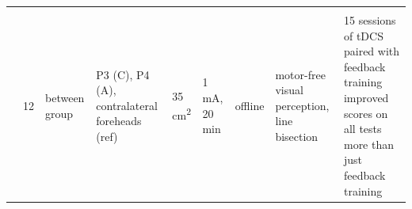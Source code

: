 \documentclass[11pt,]{memoir}
\begin{document}
\begin{longtable}[]{@{}lllllllll@{}}
\begin{minipage}[t]{0.04\columnwidth}
\strut
\end{minipage} & \begin{minipage}[t]{0.10\columnwidth}\raggedright
\strut
\end{minipage} & \begin{minipage}[t]{0.04\columnwidth}\raggedright
\strut
\end{minipage} & \begin{minipage}[t]{0.04\columnwidth}\raggedright
\strut
\end{minipage} & \begin{minipage}[t]{0.04\columnwidth}\raggedright
\strut
\end{minipage} & \begin{minipage}[t]{0.10\columnwidth}\raggedright
\strut
\end{minipage} & \begin{minipage}[t]{0.28\columnwidth}\raggedright
\strut
\end{minipage}\tabularnewline
\begin{minipage}[t]{0.09\columnwidth}\raggedright
\textcite{Bang2015}\strut
\end{minipage} & \begin{minipage}[t]{0.02\columnwidth}\raggedright
12\strut
\end{minipage} & \begin{minipage}[t]{0.04\columnwidth}\raggedright
between
group\strut
\end{minipage} & \begin{minipage}[t]{0.10\columnwidth}\raggedright
P3 (C), P4 (A),
contralateral
foreheads (ref)\strut
\end{minipage} & \begin{minipage}[t]{0.04\columnwidth}\raggedright
35
cm\textsuperscript{2}\strut
\end{minipage} & \begin{minipage}[t]{0.04\columnwidth}\raggedright
1 mA,
20 min\strut
\end{minipage} & \begin{minipage}[t]{0.04\columnwidth}\raggedright
offline\strut
\end{minipage} & \begin{minipage}[t]{0.10\columnwidth}\raggedright
motor-free visual
perception, line
bisection\strut
\end{minipage} & \begin{minipage}[t]{0.28\columnwidth}\raggedright
15 sessions of tDCS paired with feedback training improved
scores on all tests more than just feedback training\strut

\end{minipage}
\end{longtable}
\end{document}
